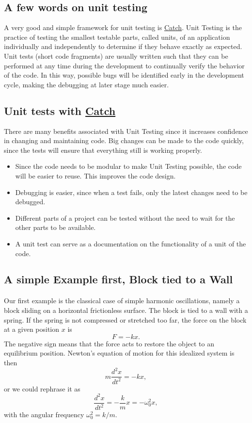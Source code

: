 \documentclass[%
oneside,                 %
final,                   %
10pt]{article}
\begin{document}
\noindent
\subsection{A few words on unit testing}
A very good and simple framework for unit testing is \href{{https://github.com/philsquared/Catch}}{Catch}.
Unit Testing is the practice of testing the smallest testable parts,
called units, of an application individually and independently to
determine if they behave exactly as expected. Unit tests (short code
fragments) are usually written such that they can be performed at any
time during the development to continually verify the behavior of the
code. In this way, possible bugs will be identified early in the
development cycle, making the debugging at later stage much
easier.


\subsection{Unit tests with \href{{https://github.com/philsquared/Catch}}{Catch}}
There are many benefits associated with Unit Testing since it  increases confidence in changing and maintaining code. Big changes can be made to the code quickly, since the tests will ensure that everything still is working properly.
\begin{itemize}
 \item Since the code needs to be modular to make Unit Testing possible, the code will be easier to reuse. This improves the code design.

 \item Debugging is easier, since when a test fails, only the latest changes need to be debugged.

 \item Different parts of a project can be tested without the need to wait for the other parts to be available.

 \item A unit test can serve as a documentation on the functionality of a unit of the code.
\end{itemize}

\noindent
\subsection{A simple Example first, Block tied to a Wall}

\paragraph{}
Our first example is the classical case of simple harmonic oscillations, namely a block sliding on a horizontal frictionless surface. The block is tied to a wall with a spring. If the spring is not compressed or stretched too far, the force on the block at a given position $x$ is 
  \[
      F=-kx.
  \]
The negative sign means that the force acts to restore the object to an equilibrium position. Newton's equation of motion for this idealized system is then 
  \[
    m\frac{d^2x}{dt^2}=-kx,
  \]
or we could rephrase it as
  \[
   \frac{d^2x}{dt^2}=-\frac{k}{m}x=-\omega_0^2x,
    \label{eq:newton1}
  \]
with the angular frequency $\omega_0^2=k/m$. 
\end{document}
